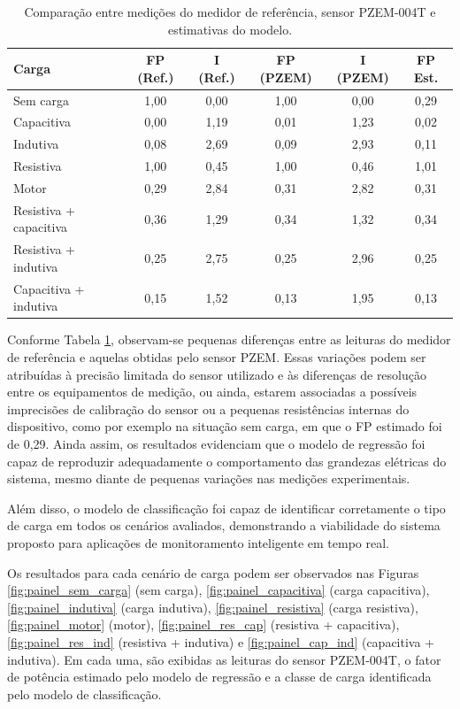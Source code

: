 \begin{table}[!htbp]
    \centering
    \caption{Comparação entre medições do medidor de referência, sensor PZEM-004T e estimativas do modelo.}
    \begin{tabular*}{\textwidth}{@{\extracolsep{\fill}}lccccc@{}}
    \hline
    \textbf{Carga} & \textbf{FP (Ref.)} & \textbf{I (Ref.)} & \textbf{FP (PZEM)} & \textbf{I (PZEM)} & \textbf{FP Est.} \\
    \hline
    Sem carga & 1,00 & 0,00 & 1,00 & 0,00 & 0,29 \\
    Capacitiva & 0,00 & 1,19 & 0,01 & 1,23 & 0,02  \\
    Indutiva & 0,08 & 2,69 & 0,09 & 2,93 & 0,11  \\
    Resistiva & 1,00 & 0,45 & 1,00 & 0,46 & 1,01 \\
    Motor & 0,29 & 2,84 & 0,31 & 2,82 & 0,31 \\
    Resistiva + capacitiva & 0,36 & 1,29 & 0,34 & 1,32 & 0,34 \\
    Resistiva + indutiva & 0,25 & 2,75 & 0,25 & 2,96 & 0,25 \\
    Capacitiva + indutiva & 0,15 & 1,52 & 0,13 & 1,95 & 0,13 \\
    \hline
    \end{tabular*}
    \label{tab:validacao_tempo_real}
\end{table}

Conforme Tabela \ref{tab:validacao_tempo_real}, observam-se pequenas diferenças entre as leituras do medidor de referência e aquelas obtidas pelo sensor PZEM. Essas variações podem ser atribuídas à precisão limitada do sensor utilizado e às diferenças de resolução entre os equipamentos de medição, ou ainda, estarem associadas a possíveis imprecisões de calibração do sensor ou a pequenas resistências internas do dispositivo, como por exemplo na situação sem carga, em que o FP estimado foi de 0,29. Ainda assim, os resultados evidenciam que o modelo de regressão foi capaz de reproduzir adequadamente o comportamento das grandezas elétricas do sistema, mesmo diante de pequenas variações nas medições experimentais.

Além disso, o modelo de classificação foi capaz de identificar corretamente o tipo de carga em todos os cenários avaliados, demonstrando a viabilidade do sistema proposto para aplicações de monitoramento inteligente em tempo real.

Os resultados para cada cenário de carga podem ser observados nas Figuras \ref{fig:painel_sem_carga} (sem carga), \ref{fig:painel_capacitiva} (carga capacitiva), \ref{fig:painel_indutiva} (carga indutiva), \ref{fig:painel_resistiva} (carga resistiva), \ref{fig:painel_motor} (motor), \ref{fig:painel_res_cap} (resistiva + capacitiva), \ref{fig:painel_res_ind} (resistiva + indutiva) e \ref{fig:painel_cap_ind} (capacitiva + indutiva). Em cada uma, são exibidas as leituras do sensor PZEM-004T, o fator de potência estimado pelo modelo de regressão e a classe de carga identificada pelo modelo de classificação.

